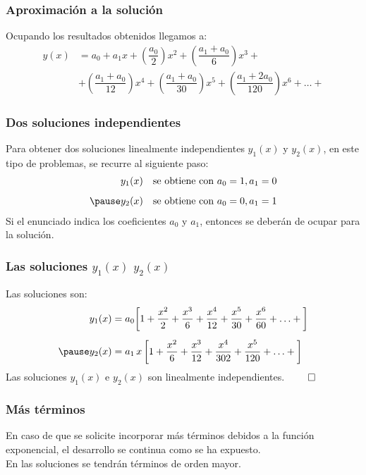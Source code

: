 \documentclass[12pt]{beamer}
\begin{document}
\begin{frame}
\frametitle{Aproximación a la solución}
Ocupando los resultados obtenidos llegamos a:
\begin{align*}
y(x) &= a_{0} + a_{1} x + \left( \dfrac{a_{0}}{2} \right) x^{2} + \left( \dfrac{a_{1} {+} a_{0}}{6} \right) x^{3} + \\[0.5em]
&+ \left( \dfrac{a_{1} {+} a_{0}}{12} \right) x^{4} + \left( \dfrac{a_{1} {+} a_{0}}{30} \right) x^{5} + \left( \dfrac{a_{1} {+} 2 a_{0}}{120} \right) x^{6} + \ldots +
\end{align*}
\end{frame}  
\begin{frame}
\frametitle{Dos soluciones independientes}
Para obtener dos soluciones linealmente independientes $y_{1}(x)$ y $y_{2}(x)$, en este tipo de problemas, \pause se recurre al siguiente paso:
\begin{eqnarray*}
y_{1}(x) \quad \mbox{se obtiene con } a_{0} = 1, a_{1} = 0 \\[0.5em] \pause
y_{2}(x) \quad \mbox{se obtiene con } a_{0} = 0, a_{1} = 1
\end{eqnarray*}
\pause
Si el enunciado indica los coeficientes $a_{0}$ y $a_{1}$, entonces se deberán de ocupar para la solución.
\end{frame}
\begin{frame}
\frametitle{Las soluciones $y_{1}(x)$ $y_{2}(x)$}
Las soluciones son:
\pause
\begin{eqnarray*}
\begin{aligned}
&y_{1}(x) = a_{0} \bigg[ 1 + \dfrac{x^{2}}{2} + \dfrac{x^{3}}{6} + \dfrac{x^{4}}{12} + \dfrac{x^{5}}{30} + \dfrac{x^{6}}{60} + \ldots + \bigg] \\[0.5em] \pause
&y_{2}(x) = a_{1} \, x \, \bigg[ 1 + \dfrac{x^{2}}{6} + \dfrac{x^{3}}{12} + \dfrac{x^{4}}{302} + \dfrac{x^{5}}{120} + \ldots + \bigg]
\end{aligned}
\end{eqnarray*}
\pause
Las soluciones $y_{1}(x)$ e $y_{2}(x)$ son linealmente independientes. $\qed$
\end{frame}
\begin{frame}
\frametitle{Más términos}
En caso de que se solicite incorporar más términos debidos a la función exponencial, el desarrollo se continua como se ha expuesto.
\\
\bigskip
En las soluciones se tendrán términos de orden mayor.
\end{frame}
\end{document}
